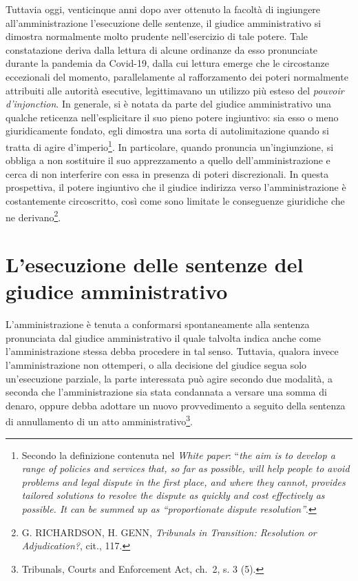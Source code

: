 \documentclass[12pt,it,a4paper,]{report}
\begin{document}
Tuttavia oggi, venticinque anni dopo aver ottenuto la facoltà di
ingiungere all'amministrazione l'esecuzione delle sentenze, il giudice
amministrativo si dimostra normalmente molto prudente nell'esercizio di
tale potere. Tale constatazione deriva dalla lettura di alcune ordinanze
da esso pronunciate durante la pandemia da Covid-19, dalla cui lettura
emerge che le circostanze eccezionali del momento, parallelamente al
rafforzamento dei poteri normalmente attribuiti alle autorità esecutive,
legittimavano un utilizzo più esteso del \emph{pouvoir d'injonction}. In
generale, si è notata da parte del giudice amministrativo una qualche
reticenza nell'esplicitare il suo pieno potere ingiuntivo: sia esso o
meno giuridicamente fondato, egli dimostra una sorta di autolimitazione
quando si tratta di agire d'imperio\footnote{Secondo la definizione
  contenuta nel \emph{White paper}: ``\emph{the aim is to develop a
  range of policies and services that, so far as possible, will help
  people to avoid problems and legal dispute in the first place, and
  where they cannot, provides tailored solutions to resolve the dispute
  as quickly and cost effectively as possible. It can be summed up as
  ``proportionate dispute resolution''}.}. In particolare, quando
pronuncia un'ingiunzione, si obbliga a non sostituire il suo
apprezzamento a quello dell'amministrazione e cerca di non interferire
con essa in presenza di poteri discrezionali. In questa prospettiva, il
potere ingiuntivo che il giudice indirizza verso l'amministrazione è
costantemente circoscritto, così come sono limitate le conseguenze
giuridiche che ne derivano\footnote{G. RICHARDSON, H. GENN,
  \emph{Tribunals in Transition: Resolution or Adjudication?}, cit.,
  117.}.

\hypertarget{lesecuzione-delle-sentenze-del-giudice-amministrativo}{%
\section{L'esecuzione delle sentenze del giudice
amministrativo}\label{lesecuzione-delle-sentenze-del-giudice-amministrativo}}

L'amministrazione è tenuta a conformarsi spontaneamente alla sentenza
pronunciata dal giudice amministrativo il quale talvolta indica anche
come l'amministrazione stessa debba procedere in tal senso. Tuttavia,
qualora invece l'amministrazione non ottemperi, o alla decisione del
giudice segua solo un'esecuzione parziale, la parte interessata può
agire secondo due modalità, a seconda che l'amministrazione sia stata
condannata a versare una somma di denaro, oppure debba adottare un nuovo
provvedimento a seguito della sentenza di annullamento di un atto
amministrativo\footnote{Tribunals, Courts and Enforcement Act, ch.~2, s.
  3 (5).}.
\end{document}
